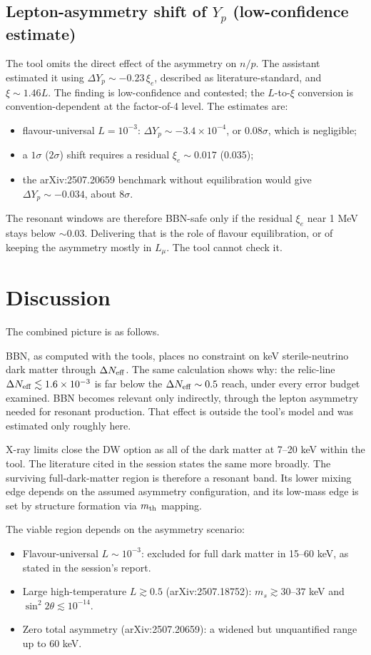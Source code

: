 \documentclass[11pt,a4paper]{article}
\begin{document}
\subsection{Lepton-asymmetry shift of $Y_p$ (low-confidence estimate)}
The tool omits the direct effect of the asymmetry on $n/p$. The assistant estimated it using $\Delta Y_p\sim-0.23\,\xi_e$, described as literature-standard, and $\xi\sim1.46L$. The finding is low-confidence and contested; the $L$-to-$\xi$ conversion is convention-dependent at the factor-of-4 level. The estimates are:
\begin{itemize}
\item flavour-universal $L=10^{-3}$: $\Delta Y_p\sim-3.4\times10^{-4}$, or $0.08\sigma$, which is negligible;
\item a $1\sigma$ ($2\sigma$) shift requires a residual $\xi_e\sim0.017$ (0.035);
\item the arXiv:2507.20659 benchmark without equilibration would give $\Delta Y_p\sim-0.034$, about $8\sigma$.
\end{itemize}
The resonant windows are therefore BBN-safe only if the residual $\xi_e$ near 1 MeV stays below $\sim0.03$. Delivering that is the role of flavour equilibration, or of keeping the asymmetry mostly in $L_\mu$. The tool cannot check it.

\section{Discussion}
The combined picture is as follows.

BBN, as computed with the tools, places no constraint on keV sterile-neutrino dark matter through $\Delta N_{\rm eff}$. The same calculation shows why: the relic-line $\Delta N_{\rm eff}\lesssim1.6\times10^{-3}$ is far below the $\Delta N_{\rm eff}\sim0.5$ reach, under every error budget examined. BBN becomes relevant only indirectly, through the lepton asymmetry needed for resonant production. That effect is outside the tool's model and was estimated only roughly here.

X-ray limits close the DW option as all of the dark matter at 7--20 keV within the tool. The literature cited in the session states the same more broadly. The surviving full-dark-matter region is therefore a resonant band. Its lower mixing edge depends on the assumed asymmetry configuration, and its low-mass edge is set by structure formation via $m_{\rm th}$ mapping.

The viable region depends on the asymmetry scenario:
\begin{itemize}
\item Flavour-universal $L\sim10^{-3}$: excluded for full dark matter in 15--60 keV, as stated in the session's report.
\item Large high-temperature $L\gtrsim0.5$ (arXiv:2507.18752): $m_s\gtrsim30$--$37$ keV and $\sin^2 2\theta\lesssim10^{-14}$.
\item Zero total asymmetry (arXiv:2507.20659): a widened but unquantified range up to 60 keV.
\end{itemize}
\end{document}
